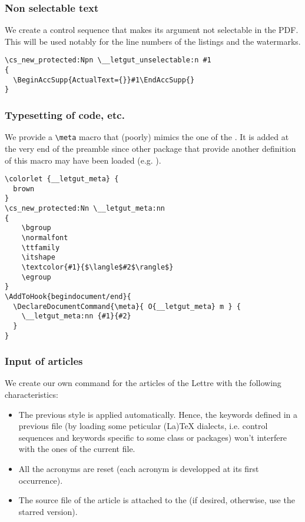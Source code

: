 \documentclass{letgut}
\begin{document}
\subsubsection{Non selectable text}
\label{ImplementationMiscellanousNonselectabletext-wh2h55h0jlj0}
We create a control sequence that makes its argument not selectable in the
PDF. This will be used notably for the line numbers of the listings and the
watermarks.
\begin{lstlisting}
\cs_new_protected:Npn \__letgut_unselectable:n #1
{
  \BeginAccSupp{ActualText={}}#1\EndAccSupp{}
}
\end{lstlisting}

\subsubsection{Typesetting of code, etc.}
\label{ImplementationMiscellanousTypesettingofcodeetc-f83h55h0jlj0}
We provide a \lstinline+\meta+ macro that (poorly) mimics the one of the
. It is added at the very end of the preamble since other
package that provide another definition of this macro may have been loaded
(e.g. ).
\begin{lstlisting}
\colorlet {__letgut_meta} {
  brown
}
\cs_new_protected:Nn \__letgut_meta:nn
{
    \bgroup
    \normalfont
    \ttfamily
    \itshape
    \textcolor{#1}{$\langle$#2$\rangle$}
    \egroup
}
\AddToHook{begindocument/end}{
  \DeclareDocumentCommand{\meta}{ O{__letgut_meta} m } {
    \__letgut_meta:nn {#1}{#2}
  }
}
\end{lstlisting}

\subsubsection{Input of articles}
\label{ImplementationMiscellanousInputofarticles-aqok3ja00pj0}
We create our own \lstinline++ command for the articles of the Lettre with the
following characteristics:

\begin{itemize}
\item The previous style is applied automatically. Hence, the keywords defined in
a previous file (by loading some peticular (La)\TeX{} dialects, i.e. control
sequences and keywords specific to some class or packages) won't interfere
with the ones of the current file.
\item All the acronyms are reset (each acronym is developped at its first occurrence).
\item The source file of the article is attached to the \pdf{} (if desired,
otherwise, use the starred version).
\end{itemize}
\end{document}
